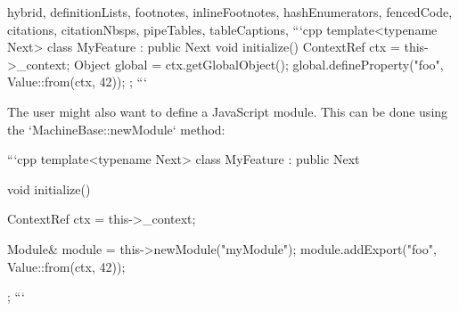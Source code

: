 \begin{markdown*}{%
  hybrid,
  definitionLists,
  footnotes,
  inlineFootnotes,
  hashEnumerators,
  fencedCode,
  citations,
  citationNbsps,
  pipeTables,
  tableCaptions,
}
```cpp
template<typename Next>
class MyFeature : public Next {
    void initialize() {
        ContextRef ctx = this->_context;
        Object global = ctx.getGlobalObject();
        global.defineProperty("foo", Value::from(ctx, 42));
    }
};
```

The user might also want to define a JavaScript module. This can be done using the `MachineBase::newModule` method:

```cpp
template<typename Next>
class MyFeature : public Next {
    void initialize() {
        ContextRef ctx = this->_context;

        Module& module = this->newModule("myModule");
        module.addExport("foo", Value::from(ctx, 42));
    }
};
```


\end{markdown*}
